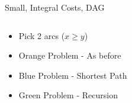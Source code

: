 \begin{frame}{Small, Integral Costs, DAG}
\begin{columns}
\begin{column}{.51\textwidth}

\begin{itemize}
  \item Pick 2 arcs ($x \geq y$)
  \item {\color{orange} Orange Problem} - As before
  \item {\color{blue} Blue Problem} - Shortest Path
  \item {\color{green} Green Problem} - Recursion 
\end{itemize}
\vspace{4cm}

\end{column}
\begin{column}{.69\textwidth}



\end{column}
\end{columns}
\end{frame}